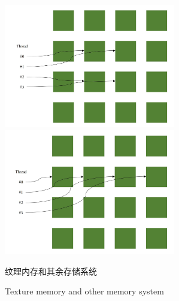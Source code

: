 \begin{figure}
	\centering
	\includegraphics[width=7.5cm]{figures/TextureM.jpg}
	\includegraphics[width=7.5cm]{figures/GlobalM.jpg}
	\renewcommand{\thefigure}{\arabic{section}-\arabic{figure} }
	\renewcommand{\figurename}{图}
	\caption{纹理内存和其余存储系统}
	\addtocounter{figure}{-1}
	\renewcommand{\thefigure}{\arabic{section}-\arabic{figure} }
	\renewcommand{\figurename}{Figure}
	\caption{Texture memory and other memory system}
	\label{Fig.TextureAndGlobal}
\end{figure}

